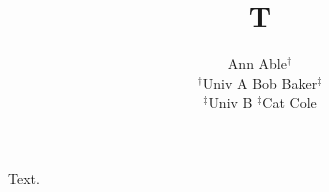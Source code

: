 \documentclass{article}
\title{T}
\author{Ann Able$^\dagger$ \\ $^\dagger$Univ A \quad Bob Baker$^\ddagger$ \\ $^\ddagger$Univ B \quad $^\ddagger$Cat Cole}
\begin{document}
\maketitle
Text.
\end{document}

